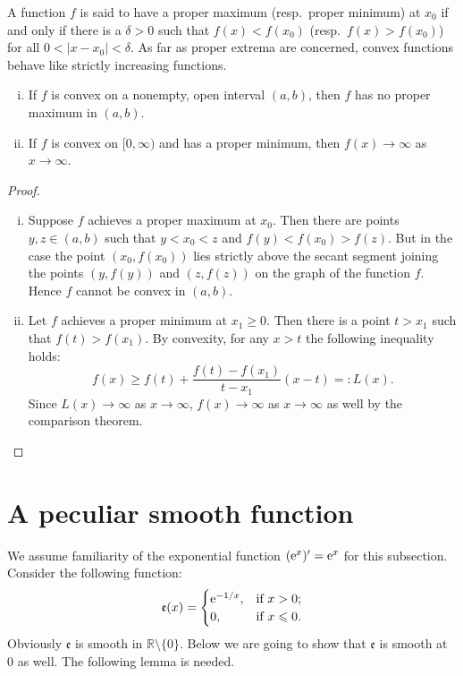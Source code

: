 A function $f$ is said to have a \textsf{proper maximum} (resp.\ \textsf{proper minimum}) at $x_0$ if and only if there is a $\delta > 0$ such that $f(x) < f(x_0)$ (resp.\ $f(x) > f(x_0)$) for all $0 < |x - x_0| < \delta$.
As far as proper extrema are concerned, convex functions behave like strictly increasing functions.

\begin{thm}
  \begin{enumerate}[(i)]
    \item If $f$ is convex on a nonempty, open interval $(a,b)$, then $f$ has no proper maximum in $(a,b)$.
    \item If $f$ is convex on $[0,\infty)$ and has a proper minimum, then $f(x) \to \infty$ as $x \to \infty$.
  \end{enumerate}
\end{thm}

\begin{proof}
  \begin{enumerate}[(i)]
    \item Suppose $f$ achieves a proper maximum at $x_0$.
      Then there are points $y, z \in (a,b)$ such that $y < x_0 < z$ and $f(y) < f(x_0) > f(z)$.
      But in the case the point $(x_0, f(x_0))$ lies strictly above the secant segment joining the points $(y, f(y))$ and $(z, f(z))$ on the graph of the function $f$.  Hence $f$ cannot be convex in $(a,b)$.

    \item Let $f$ achieves a proper minimum at $x_1 \geqslant 0$.
      Then there is a point $t > x_1$ such that $f(t) > f(x_1)$.
      By convexity, for any $x > t$ the following inequality holds:
      \[
	f(x) \geqslant f(t) + \frac{ f(t) - f(x_1) }{ t - x_1 } (x - t) =: L(x).
      \]
      Since $L(x) \to \infty$ as $x \to \infty$, $f(x) \to \infty$ as $x \to \infty$ as well by the comparison theorem.
  \end{enumerate}
\end{proof}

\section{A peculiar smooth function}
\label{sec:smooth-not-analytic}

We assume familiarity of the exponential function $(\mathrm e^x)' = \mathrm e^x$ for this subsection.
Consider the following function:
\begin{equation}
  \label{eq:vanish-e}
  \mathfrak{e}(x) = 
  \begin{cases}
    \mathrm e^{-1/x}, & \text{if $x > 0$}; \\
    0         , & \text{if $x \leqslant 0$}.
  \end{cases}
\end{equation}
Obviously $\mathfrak{e}$ is smooth in $\mathbb{R} \setminus \{ 0 \}$.
Below we are going to show that $\mathfrak{e}$ is smooth at $0$ as well.
The following lemma is needed.

